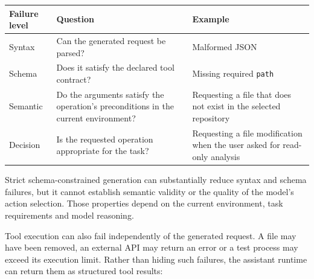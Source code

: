 \noindent\begin{minipage}{\linewidth}
\captionsetup{hypcap=false}
\label{tab:tool-failures}
\small\singlespacing
\renewcommand{\arraystretch}{1.15}
\begin{tabular}{@{}p{2.0cm}p{6.5cm}p{7.0cm}@{}}
\toprule
{\raggedright\textbf{Failure level}\par} & \textbf{Question} & \textbf{Example} \\
\midrule
{\raggedright Syntax\par} & {\raggedright Can the generated request be parsed?\par} & {\raggedright Malformed JSON\par} \\
{\raggedright Schema\par} & {\raggedright Does it satisfy the declared tool contract?\par} & {\raggedright Missing required \texttt{path}\par} \\
{\raggedright Semantic\par} & {\raggedright Do the arguments satisfy the operation's preconditions in the current environment?\par} & {\raggedright Requesting a file that does not exist in the selected repository\par} \\
{\raggedright Decision\par} & {\raggedright Is the requested operation appropriate for the task?\par} & {\raggedright Requesting a file modification when the user asked for read-only analysis\par} \\
\bottomrule
\end{tabular}
\end{minipage}

Strict schema-constrained generation can substantially reduce syntax and schema failures, but it cannot establish semantic validity or the quality of the model's action selection. Those properties depend on the current environment, task requirements and model reasoning.

Tool execution can also fail independently of the generated request. A file may have been removed, an external API may return an error or a test process may exceed its execution limit. Rather than hiding such failures, the assistant runtime can return them as structured tool results:

